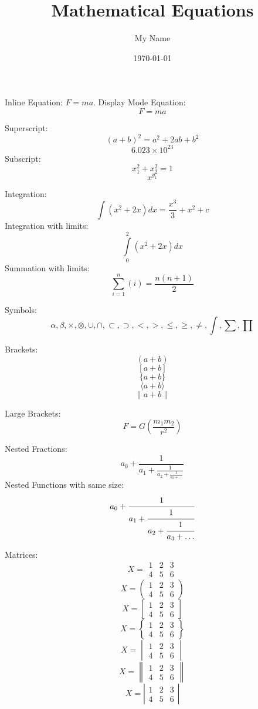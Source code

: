 \documentclass[a4paper, 12pt]{article}
\title{Mathematical Equations}
\author{My Name}
\date{\today}
\begin{document}
\maketitle

Inline Equation: $F = ma$.
Display Mode Equation:
$$F = ma$$

Superscript:
$$(a + b)^2 = a^2 + 2ab + b^2$$
$$6.023 \times 10^{23}$$
Subscript:
$$x_1^2 + x^2_2 = 1$$
$$x^{y_1}$$

Integration:
$$\int(x^2 + 2x)dx = \frac{x^3}{3} + x^2 + c$$
Integration with limits:
$$\int\limits_0^2(x^2 + 2x)dx$$
Summation with limits:
$$\sum\limits_{i=1}^n (i) = \frac{n(n + 1)}{2}$$

Symbols:
$$\alpha, \beta, \times, \otimes, \cup, \cap, \subset, \supset, <, >, \leq, \geq, \neq, \int, \sum, \prod$$

Brackets:
$$(a + b)$$
$$[a + b]$$
$$\{a + b\}$$
$$\langle a+b \rangle$$
$$\|a + b\|$$

Large Brackets:
$$F = G\left(\frac{m_1 m_2}{r^2}\right)$$

Nested Fractions:
$$a_0 + \frac{1}{a_1 + \frac{1}{a_2 + \frac{1}{a_3+\dots}}}$$
Nested Functions with same size:
$$a_0 + \cfrac{1}{a_1 + \cfrac{1}{a_2 + \cfrac{1}{a_3+\dots}}}$$

Matrices:
$$
X =
\begin{matrix}
1 & 2 & 3\\
4 & 5 & 6
\end{matrix}
$$
$$
X =
\begin{pmatrix}
1 & 2 & 3\\
4 & 5 & 6
\end{pmatrix}
$$
$$
X =
\begin{bmatrix}
1 & 2 & 3\\
4 & 5 & 6
\end{bmatrix}
$$
$$
X =
\begin{Bmatrix}
1 & 2 & 3\\
4 & 5 & 6
\end{Bmatrix}
$$
$$
X =
\begin{vmatrix}
1 & 2 & 3\\
4 & 5 & 6
\end{vmatrix}
$$
$$
X =
\begin{Vmatrix}
1 & 2 & 3\\
4 & 5 & 6
\end{Vmatrix}
$$
$$
X = \left|\begin{matrix}
1 & 2 & 3\\
4 & 5 & 6
\end{matrix}\right|
$$
\end{document}

